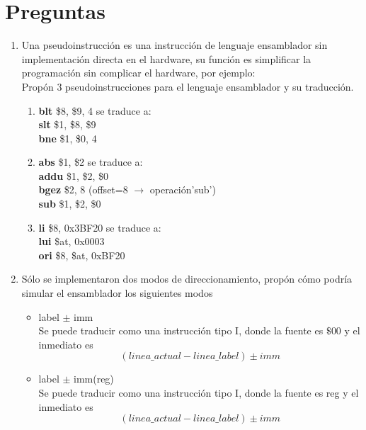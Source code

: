 \documentclass{article}
\begin{document}
    \section{Preguntas}
    \begin{enumerate}

    \item {
    Una pseudoinstrucción es una instrucción de lenguaje ensamblador sin implementación directa en el hardware, su función es simplificar la programación sin complicar el hardware, por ejemplo:\\

    Propón 3 pseudoinstrucciones para el lenguaje ensamblador y su traducción.
	
	\begin{enumerate}
		\item {
		\textbf{blt} \$8, \$9, 4 se traduce a:\\ 
		
		\textbf{slt} \$1, \$8, \$9\\
		\textbf{bne} \$1, \$0, 4\\
		}
		\item {
		\textbf{abs} \$1, \$2 se traduce a:\\
		
		\textbf{addu} \$1, \$2, \$0\\
		\textbf{bgez} \$2, 8 (offset=8 $\rightarrow$ operación'sub')\\
		\textbf{sub} \$1, \$2, \$0\\
		}
		\item {
		\textbf{li} \$8, 0x3BF20 se traduce a:\\
		
		\textbf{lui} \$at, 0x0003\\
		\textbf{ori} \$8, \$at, 0xBF20
		}
	\end{enumerate}
	}

	\item {
	Sólo se implementaron dos modos de direccionamiento, propón cómo podría
	simular el ensamblador los siguientes modos
	\begin{itemize}
		\item {
			label $\pm$ imm \\
			Se puede traducir como una instrucción tipo I, donde la fuente es 
			$\$00$ y el inmediato es
			\[(linea\_actual - linea\_label) \pm imm\]
		}
		\item {
			label $\pm$ imm(reg) \\
			Se puede traducir como una instrucción tipo I, donde la fuente es 
			reg y el inmediato es
			\[(linea\_actual - linea\_label) \pm imm\]
		}
	\end{itemize}

	}

    \end{enumerate}
\end{document}
